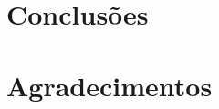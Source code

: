 \documentclass[paper=a4, fontsize=11pt]{scrartcl}
\begin{document}
\section{Conclusões}

\section{Agradecimentos} 


{}


\end{document}
